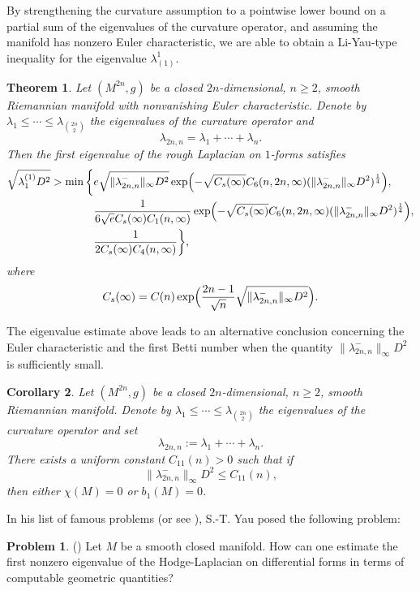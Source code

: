 \documentclass[12pt, twoside]{article}
\newtheorem{theorem}{Theorem}[section]
\newtheorem{corollary}[theorem]{Corollary}
\theoremstyle{definition}
\numberwithin{equation}{section}
\newtheorem*{problem}{Problem}
\def \la {\lambda}
\begin{document}
By strengthening the curvature assumption to a pointwise lower bound on a partial sum of the eigenvalues of the curvature operator, and assuming the manifold has nonzero Euler characteristic,  we are able to obtain a Li-Yau-type inequality for the eigenvalue $\la^{1}_{(1)}$.
\begin{theorem}
	\label{thm:eigenvalue}
	Let $(M^{2n},g)$ be a closed $2n$-dimensional, $n\ge2$, smooth Riemannian manifold with nonvanishing Euler characteristic. Denote by $\lambda_{1}\leq\cdots\leq\lambda_{\binom{2n}{2}}$ the eigenvalues of the curvature operator and
	$$\la_{2n,n}=\lambda_{1}+\cdots+\lambda_{n}.$$
	 Then the first eigenvalue of the rough Laplacian on $1$-forms satisfies	
\begin{equation} \label{V8}
\begin{split}
	\sqrt{\lambda_{1}^{(1)}D^{2}}
	>\min\bigg\{&e\sqrt{\|\la^{-}_{2n,n}\|_{\infty}D^{2}}\exp\Bigl(-\sqrt{C_s(\infty)}C_6(n,2n,\infty)(\|\la^{-}_{2n,n}\|_{\infty}D^{2})^{\frac{1}{4}}\Big),\\
	& \frac{1}{6\sqrt{e}C_s(\infty) C_{1}(n,\infty)}\exp\Bigl(-\sqrt{C_s(\infty)}C_6(n,2n,\infty)(\|\la^{-}_{2n,n}\|_{\infty}D^{2})^{\frac{1}{4}}\Bigr ),\\
	&\frac{1}{2C_s(\infty) C_{4}(n,\infty)}\bigg\},
	\end{split}
	\end{equation}
 where \[C_s(\infty) = C(n)\exp\Bigl(\frac{2n-1}{\sqrt{n}}
 \sqrt{\|\lambda^{-}_{2n,n}\|_{\infty}D^{2}}\Bigr).\]
\end{theorem}
The eigenvalue estimate above leads to an alternative conclusion concerning the Euler characteristic and the first Betti number when the quantity \(\|\lambda_{2n,n}^{-}\|_{\infty}D^{2}\) is sufficiently small.
\begin{corollary}\label{cor:euler-betti-choice}
	Let $(M^{2n},g)$ be a closed $2n$-dimensional, $n\geq2$, smooth Riemannian manifold. Denote by $\lambda_{1}\leq\cdots\leq\lambda_{\binom{2n}{2}}$ the eigenvalues of the curvature operator and set 
	\[
	\lambda_{2n,n}:=\lambda_{1}+\cdots+\lambda_{n}.
	\]
	There exists a uniform constant $C_{11}(n)>0$ such that if 
	\[
	\|\lambda_{2n,n}^{-}\|_{\infty}D^{2}\leq C_{11}(n),
	\]
	then either $\chi(M)=0$ or $b_{1}(M)=0$.
\end{corollary}
In his list of famous problems \cite{Yau1982} (or see \cite{Schoen1994}), S.-T. Yau posed the following problem:
\begin{problem}(\cite[Problem 79]{Yau1982})
Let $M$ be a smooth closed manifold. How can one estimate the first nonzero eigenvalue of the Hodge-Laplacian on differential forms in terms of computable geometric quantities?
\end{problem}
\end{document}
